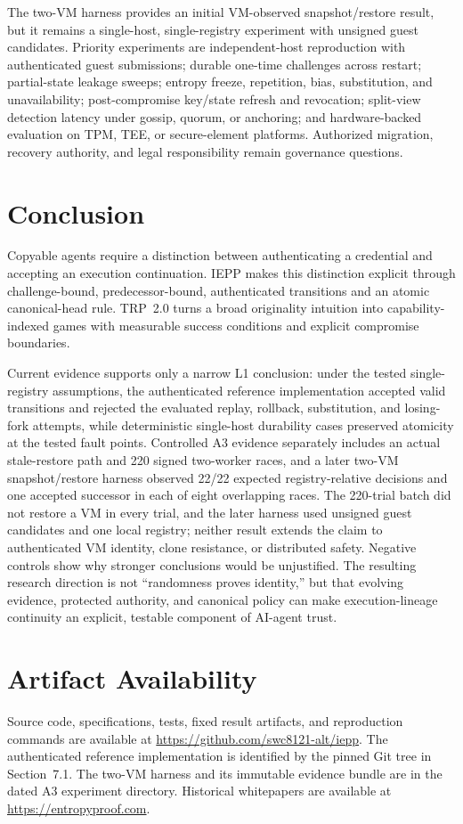 \documentclass[11pt]{article}
\newcommand{\iepp}{\textsc{IEPP}}
\begin{document}
The two-VM harness provides an initial VM-observed snapshot/restore result, but it remains a single-host, single-registry experiment with unsigned guest candidates. Priority experiments are independent-host reproduction with authenticated guest submissions; durable one-time challenges across restart; partial-state leakage sweeps; entropy freeze, repetition, bias, substitution, and unavailability; post-compromise key/state refresh and revocation; split-view detection latency under gossip, quorum, or anchoring; and hardware-backed evaluation on TPM, TEE, or secure-element platforms. Authorized migration, recovery authority, and legal responsibility remain governance questions.

\section{Conclusion}
Copyable agents require a distinction between authenticating a credential and accepting an execution continuation. \iepp{} makes this distinction explicit through challenge-bound, predecessor-bound, authenticated transitions and an atomic canonical-head rule. TRP~2.0 turns a broad originality intuition into capability-indexed games with measurable success conditions and explicit compromise boundaries.

Current evidence supports only a narrow L1 conclusion: under the tested single-registry assumptions, the authenticated reference implementation accepted valid transitions and rejected the evaluated replay, rollback, substitution, and losing-fork attempts, while deterministic single-host durability cases preserved atomicity at the tested fault points. Controlled A3 evidence separately includes an actual stale-restore path and 220 signed two-worker races, and a later two-VM snapshot/restore harness observed 22/22 expected registry-relative decisions and one accepted successor in each of eight overlapping races. The 220-trial batch did not restore a VM in every trial, and the later harness used unsigned guest candidates and one local registry; neither result extends the claim to authenticated VM identity, clone resistance, or distributed safety. Negative controls show why stronger conclusions would be unjustified. The resulting research direction is not ``randomness proves identity,'' but that evolving evidence, protected authority, and canonical policy can make execution-lineage continuity an explicit, testable component of AI-agent trust.

\section*{Artifact Availability}
Source code, specifications, tests, fixed result artifacts, and reproduction commands are available at \url{https://github.com/swc8121-alt/iepp}. The authenticated reference implementation is identified by the pinned Git tree in Section~7.1. The two-VM harness and its immutable evidence bundle are in the dated A3 experiment directory. Historical whitepapers are available at \url{https://entropyproof.com}.



\end{document}
